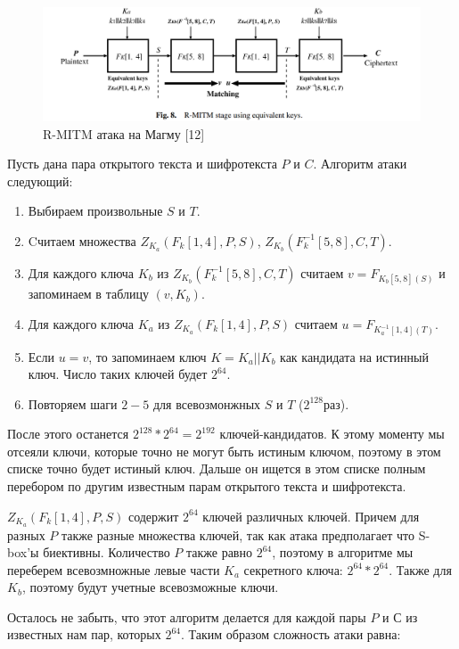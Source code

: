\documentclass[colorthm]{./civarticle}
\begin{document}
\begin{figure}
    \centering
    \includegraphics[width=0.75\linewidth]{mitm.png}
    \caption{R-MITM атака на Магму [12]}
    \label{fig:enter-label}
\end{figure}

Пусть дана пара открытого текста и шифротекста $P$ и $C$. Алгоритм атаки следующий:

\begin{enumerate}
    \item Выбираем произвольные $S$ и $T$.
    \item Cчитаем множества $Z_{K_a}(F_k[1, 4], P, S)$, $Z_{K_b}(F_k^{-1}[5, 8], C, T)$.
    \item Для каждого ключа $K_b$ из $Z_{K_b}(F_k^{-1}[5, 8], C, T)$ считаем $v = F_{K_b[5,8](S)}$ и запоминаем в таблицу $(v, K_b)$.
    \item Для каждого ключа $K_a$ из $Z_{K_a}(F_k[1, 4], P, S)$ считаем $u = F_{K^{-1}_a[1,4](T)}$.
    \item Если $u=v$, то запоминаем ключ $K=K_a||K_b$ как кандидата на истинный ключ. Число таких ключей будет $2^{64}$.
    \item Повторяем шаги $2-5$ для всевозмонжных $S$ и $T$ ($2^{128} раз$).
\end{enumerate}

После этого останется $2^{128} * 2^{64} = 2^{192}$ ключей-кандидатов. К этому моменту мы отсеяли ключи, которые точно не могут быть истиным ключом, поэтому в этом списке точно будет истиный ключ. Дальше он ищется в этом списке полным перебором по другим известным парам открытого текста и шифротекста.

$Z_{K_a}(F_k[1, 4], P, S)$ содержит $2^{64}$ ключей различных ключей. Причем для разных $P$ также разные множества ключей, так как атака предполагает что S-box'ы биективны. Количество $P$ также равно $2^{64}$, поэтому в алгоритме мы переберем всевозмножные левые части $K_a$ секретного ключа: $2^{64}*2^{64}$. Также для $K_b$, поэтому будут учетные всевозможные ключи.

Осталось не забыть, что этот алгоритм делается для каждой пары $P$ и $С$ из известных нам пар, которых $2^{64}$. Таким образом сложность атаки равна:
\end{document}
